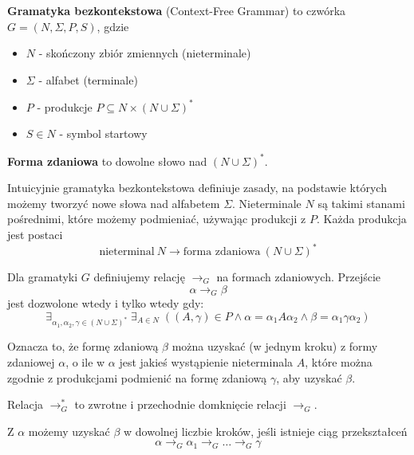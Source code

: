 \begin{definition}
\textbf{Gramatyka bezkontekstowa} (Context-Free Grammar) to czwórka \linebreak \( G = (N, \Sigma, P, S) \), gdzie
\begin{itemize}
    \item \( N \) - skończony zbiór zmiennych (nieterminale)
    \item \( \Sigma \) - alfabet (terminale)
    \item \( P \) - produkcje \( P \subseteq N \times (N \cup \Sigma)^* \)
    \item \( S \in N \) - symbol startowy
\end{itemize}
\end{definition}

\begin{definition}
    \textbf{Forma zdaniowa} to dowolne słowo nad \( (N \cup \Sigma)^* \).
\end{definition}

Intuicyjnie gramatyka bezkontekstowa definiuje zasady, na podstawie których możemy tworzyć nowe słowa nad alfabetem \( \Sigma \).
Nieterminale \( N \) są takimi stanami pośrednimi, które możemy podmieniać, używając produkcji z \( P \).
Każda produkcja jest postaci
\[
    \text{nieterminal} \ N \rightarrow \text{forma zdaniowa} \ (N \cup \Sigma)^*
\]

\begin{definition}
    Dla gramatyki \( G \) definiujemy relację \( \rightarrow_G \) na formach zdaniowych.
    Przejście
    \[ 
        \alpha \rightarrow_G \beta
    \]
    jest dozwolone wtedy i tylko wtedy gdy:
    \[
        \exists_{\alpha_1, \alpha_2, \gamma \in (N \cup \Sigma)^*}\; \exists_{A \in N}\; \left( (A, \gamma) \in P \land
        \alpha = \alpha_1  A \alpha_2 \land \beta = \alpha_1 \gamma \alpha_2 \right)
    \]
\end{definition}

Oznacza to, że formę zdaniową \( \beta \) można uzyskać (w jednym kroku) z formy zdaniowej \( \alpha \), o ile w  \( \alpha \) jest jakieś wystąpienie nieterminala \( A \), które można zgodnie z produkcjami podmienić na formę zdaniową \( \gamma \), aby uzyskać \( \beta \).

\begin{definition}
    Relacja \( \rightarrow_G^* \) to zwrotne i przechodnie domknięcie relacji \( \rightarrow_G \).
\end{definition}

Z \( \alpha \) możemy uzyskać \( \beta \) w dowolnej liczbie kroków, jeśli istnieje ciąg przekształceń
\[ \alpha \rightarrow_G \alpha_1 \rightarrow_G \dots \rightarrow_G \gamma \]


